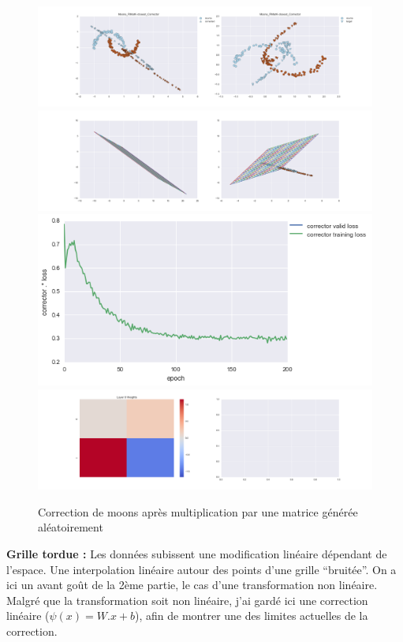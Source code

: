 \begin{figure}[H] %
\centering
\includegraphics[width=\linewidth]{fig/24-05-2016/moons/Moons_RMatK-closest_Corrector-DATA.png}
\includegraphics[width=\linewidth]{fig/24-05-2016/moons/Moons_RMatK-closest_Corrector-GridCheck.png}
\includegraphics[width=0.45\linewidth]{fig/24-05-2016/moons/Moons_RMatK-closest_Corrector-Learning_curve.png}
\includegraphics[width=\linewidth]{fig/24-05-2016/moons/Moons_RMatK-closest_Corrector-W.png}
\caption{Correction de moons après multiplication par une matrice générée aléatoirement}
\label{fig:recap-moons-RMat-exhaustive}
\end{figure}


{\Large \textbf{Grille tordue :}} Les données subissent une modification linéaire dépendant de l'espace.
Une interpolation linéaire autour des points d'une grille ``bruitée''.
On a ici un avant goût de la 2ème partie, le cas d'une transformation non linéaire.
Malgré que la transformation soit non linéaire, j'ai gardé ici une correction linéaire ($\psi(x) = W.x+b$),
afin de montrer une des limites actuelles de la correction.

